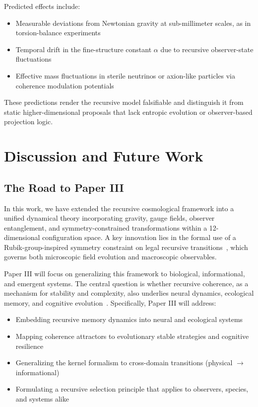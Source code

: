 \documentclass[11pt]{article}
\begin{document}
Predicted effects include:

\begin{itemize}[leftmargin=1.5em]
\item Measurable deviations from Newtonian gravity at sub-millimeter scales, as in torsion-balance experiments~\cite{adelberger2009torsion}
\item Temporal drift in the fine-structure constant $\alpha$ due to recursive observer-state fluctuations~\cite{uzan2011varying}
\item Effective mass fluctuations in sterile neutrinos or axion-like particles via coherence modulation potentials~\cite{ringwald2012axions}
\end{itemize}

These predictions render the recursive model falsifiable and distinguish it from static higher-dimensional proposals that lack entropic evolution or observer-based projection logic.



\section{Discussion and Future Work}

\subsection{The Road to Paper III}

In this work, we have extended the recursive cosmological framework into a unified dynamical theory incorporating gravity, gauge fields, observer entanglement, and symmetry-constrained transformations within a 12-dimensional configuration space. A key innovation lies in the formal use of a Rubik-group-inspired symmetry constraint on legal recursive transitions~\cite{joyner2008adventures}, which governs both microscopic field evolution and macroscopic observables.

Paper III will focus on generalizing this framework to biological, informational, and emergent systems. The central question is whether recursive coherence, as a mechanism for stability and complexity, also underlies neural dynamics, ecological memory, and cognitive evolution~\cite{wolpert2001search, mitchell2021complexity}. Specifically, Paper III will address:

\begin{itemize}[leftmargin=1.5em]
\item Embedding recursive memory dynamics into neural and ecological systems
\item Mapping coherence attractors to evolutionary stable strategies and cognitive resilience
\item Generalizing the kernel formalism to cross-domain transitions (physical $\to$ informational)
\item Formulating a recursive selection principle that applies to observers, species, and systems alike
\end{itemize}
\end{document}
